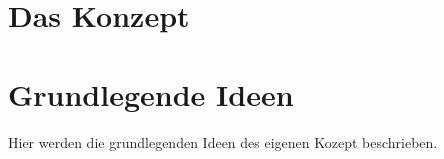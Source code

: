 \chapter{Das Konzept}
\label{sec:Das Konzept}

\chapter{Grundlegende Ideen}
Hier werden die grundlegenden Ideen des eigenen Kozept beschrieben.

